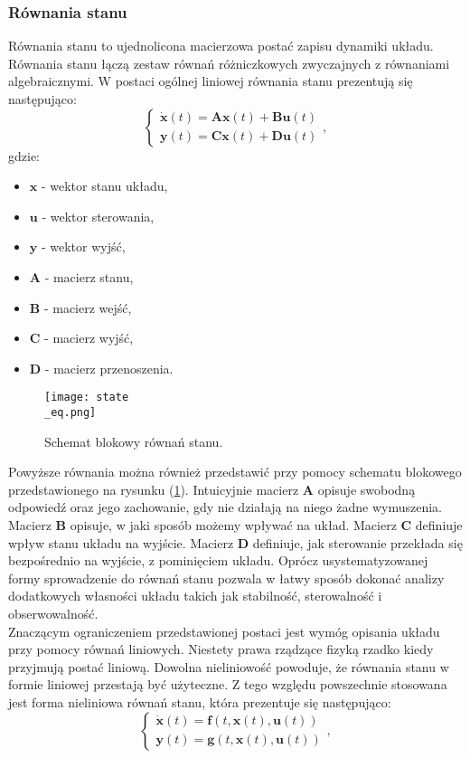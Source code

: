 \subsubsection{Równania stanu}

Równania stanu to ujednolicona macierzowa postać zapisu dynamiki układu. Równania stanu łączą zestaw równań różniczkowych zwyczajnych z równaniami algebraicznymi. W postaci ogólnej liniowej równania stanu prezentują się następująco:
\[
	\begin{cases}
		\dot{\bm{x}} \left(t\right)  = \bm{Ax} \left(t\right)  + \bm{Bu} \left(t\right) \\
		\bm{y} \left(t\right) = \bm{Cx} \left(t\right) + \bm{Du} \left(t\right)
	\end{cases},
\]
gdzie:
\begin{itemize}
\item $\bm{x}$ - wektor stanu układu,
\item $\bm{u}$ - wektor sterowania,
\item $\bm{y}$ - wektor wyjść,
\item $\bm{A}$ - macierz stanu,
\item $\bm{B}$ - macierz wejść,
\item $\bm{C}$ - macierz wyjść,
\item $\bm{D}$ - macierz przenoszenia.
\end{itemize}




\begin{figure}[!h]
   	\centering
      	\texttt{[image: state\\\_eq.png]}
      	\caption{Schemat blokowy równań stanu.}
      	\label{rnie_stanu}
\end{figure}

Powyższe równania można również przedstawić przy pomocy schematu blokowego przedstawionego na rysunku (\ref{rnie_stanu}).
Intuicyjnie macierz $\bm{A}$ opisuje swobodną odpowiedź oraz jego zachowanie, gdy nie działają na niego żadne wymuszenia. Macierz $\bm{B}$ opisuje, w jaki sposób możemy wpływać na układ. Macierz $\bm{C}$ definiuje wpływ stanu układu na wyjście. Macierz $\bm{D}$ definiuje, jak sterowanie przekłada się bezpośrednio na wyjście, z pominięciem układu. Oprócz usystematyzowanej formy sprowadzenie do równań stanu pozwala w łatwy sposób dokonać analizy dodatkowych własności układu takich jak stabilność, sterowalność i obserwowalność.\\

Znaczącym ograniczeniem przedstawionej postaci jest wymóg opisania układu przy pomocy równań liniowych. Niestety prawa rządzące fizyką rzadko kiedy przyjmują postać liniową. Dowolna nieliniowość powoduje, że równania stanu w formie liniowej przestają być użyteczne. Z tego względu powszechnie stosowana jest forma nieliniowa równań stanu, która prezentuje się następująco:
\[
	\begin{cases}
		\dot{\bm{x}} \left(t\right)  =  \bm{f}  \left( t, \bm{x} \left(t\right)  , \bm{u} \left(t\right) \right) \\
		\bm{y} \left(t\right) = \bm{g}  \left( t, \bm{x} \left(t\right) , \bm{u} \left(t\right) \right)
	\end{cases},
\]

